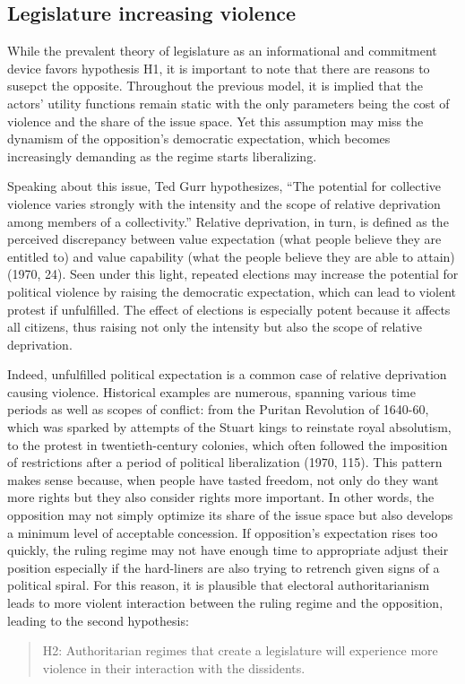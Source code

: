 \subsection{Legislature increasing violence}
While the prevalent theory of legislature as an informational and commitment device favors hypothesis H1, it is important to note that there are reasons to susepct the opposite. Throughout the previous model, it is implied that the actors’ utility functions remain static with the only parameters being the cost of violence and the share of the issue space. Yet this assumption may miss the dynamism of the opposition’s democratic expectation, which becomes increasingly demanding as the regime starts liberalizing.

Speaking about this issue, Ted Gurr hypothesizes, ``The potential for collective violence varies strongly with the intensity and the scope of relative deprivation among members of a collectivity.'' Relative deprivation, in turn, is defined as the perceived discrepancy between value expectation (what people believe they are entitled to) and value capability (what the people believe they are able to attain) (1970, 24). Seen under this light, repeated elections may increase the potential for political violence by raising the democratic expectation, which can lead to violent protest if unfulfilled. The effect of elections is especially potent because it affects all citizens, thus raising not only the intensity but also the scope of relative deprivation.

Indeed, unfulfilled political expectation is a common case of relative deprivation causing violence. Historical examples are numerous, spanning various time periods as well as scopes of conflict: from the Puritan Revolution of 1640-60, which was sparked by attempts of the Stuart kings to reinstate royal absolutism, to the protest in twentieth-century colonies, which often followed the imposition of restrictions after a period of political liberalization (1970, 115). This pattern makes sense because, when people have tasted freedom, not only do they want more rights but they also consider rights more important. In other words, the opposition may not simply optimize its share of the issue space but also develops a minimum level of acceptable concession. If opposition’s expectation rises too quickly, the ruling regime may not have enough time to appropriate adjust their position especially if the hard-liners are also trying to retrench given signs of a political spiral. For this reason, it is plausible that electoral authoritarianism leads to more violent interaction between the ruling regime and the opposition, leading to the second hypothesis:

\begin{quote}
H2: Authoritarian regimes that create a legislature will experience more violence in their interaction with the dissidents.
\end{quote}